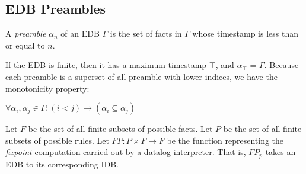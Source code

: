 
\subsection{EDB Preambles}



\begin{definition}
A \emph{preamble} $\alpha_{n}$ of an EDB $\Gamma$ is the set of facts in $\Gamma$ whose timestamp is less than or equal to $n$.
\end{definition}

If the EDB is finite, then it has a maximum timestamp $\top$, and $\alpha_{\top}$ = $\Gamma$.  Because each preamble is a superset of all 
preamble with lower indices, we have the monotonicity property:

$\forall \alpha_{i}, \alpha_{j} \in \Gamma : (i < j) \to (\alpha_{i} \subseteq \alpha_{j})$



\begin{definition}
%
Let $F$ be the set of all finite subsets of possible facts.  Let $P$ be the set
of all finite subsets of possible rules.  Let $FP : P \times F \mapsto F$ be
the function representing the \emph{fixpoint} computation carried out by a
datalog interpreter.  That is, $FP_p$ takes an EDB to its corresponding IDB.
%
\end{definition}


